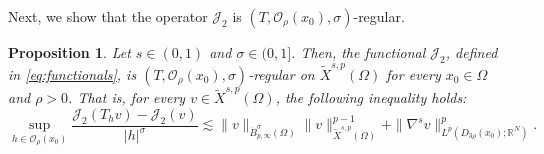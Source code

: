 \documentclass[]{amsart}
\newtheorem{proposition}[theorem]{Proposition}
\theoremstyle{definition}
\theoremstyle{definition}
\theoremstyle{remark}
\numberwithin{equation}{section}
\begin{document}
	Next, we show that the operator \( \mathcal{J}_2 \) is \( \left(T, \mathcal{O}_\rho(x_0), \sigma\right) \)-regular.
\begin{proposition}
	\label{Regularidad: Regularidad F_2 Proposition}
	Let \( s \in (0,1) \) and \( \sigma \in (0,1] \). Then, the functional \( \mathcal{J}_2\), defined in \eqref{eq:functionals}, is \( (T, \mathcal{O}_\rho(x_0), \sigma) \)-regular on \( \widetilde{X}^{s,p}(\Omega) \) for every \( x_0 \in \Omega \) and \( \rho > 0 \). That is, for every \( v \in \widetilde{X}^{s,p}(\Omega) \), the following inequality holds:
	\begin{equation}
		\label{Regularidad: Regularidad F_2}
		\sup_{h \in \mathcal{O}_\rho(x_0)} \frac{\mathcal{J}_2(T_h v) - \mathcal{J}_2(v)}{|h|^{\sigma }} \lesssim \|v\|_{\dot{B}^\sigma_{p,\infty}(\Omega)} \|v\|_{\widetilde{X}^{s,p}(\Omega)}^{p-1} + \|\nabla^s v\|_{L^p(D_{3\rho}(x_0);\mathbb{R}^N)}^p.
	\end{equation}
\end{proposition}
\end{document}
